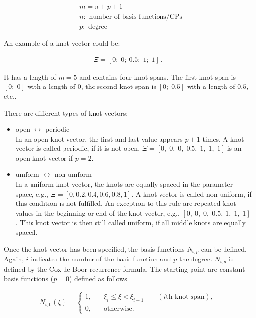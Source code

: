 \documentclass[11pt,a4paper]{article}
\begin{document}
\begin{align}
&m=n+p+1 \\
		&n:\text{ number of basis functions/CPs} \nonumber \\
		&p:\text{ degree} \nonumber 
\end{align}

An example of a knot vector could be:

\begin{align}
\Xi=[0;\; 0;\; 0.5;\; 1;\; 1] \,.
\end{align}

It has a length of $m=5$ and contains four knot spans. The first knot span is $[0;\; 0]$ with a length of $0$, the second knot span is $ [0;\; 0.5] $ with a length of $0.5$, etc..

There are different types of knot vectors:

	\begin{itemize}
	\item open  $\leftrightarrow$ periodic \\
		In an open knot vector, the first and last value appears $p+1$ times. A knot vector is called periodic, if it is not open. $\Xi=[0,\; 0,\; 0,\; 0.5,\; 1,\; 1,\; 1]$ is an open knot vector if $p=2$.		
    \item uniform  $\leftrightarrow$ non-uniform \\
		In a uniform knot vector, the knots are equally spaced in the parameter space, e.g., $ \Xi=[0, 0.2, 0.4, 0.6, 0.8, 1]$. A knot vector is called non-uniform, if this condition is not fulfilled. An exception to this rule are repeated knot values in the beginning or end of the knot vector, e.g., $[0,\; 0,\; 0,\; 0.5,\; 1,\; 1,\; 1]$. This knot vector is then still called uniform, if all middle knots are equally spaced. 
	\end{itemize}

\vspace{0.5cm}
Once the knot vector has been specified, the basis functions $N_{i,p}$ can be defined. Again, $i$ indicates the number of the basis function and $p$ the degree.  $N_{i,p}$ is defined by the Cox de Boor recurrence formula. The starting point are constant basis functions ($p=0$) defined as follows:

\begin{align}
N_{i,0}(\xi)=
	\begin{cases}
		1,	& \quad \xi_{i}\le\xi<\xi_{i+1} \qquad (i\text{th knot span}), \\
		0,	& \quad \text{otherwise.}
	\end{cases}
\end{align}
\end{document}
